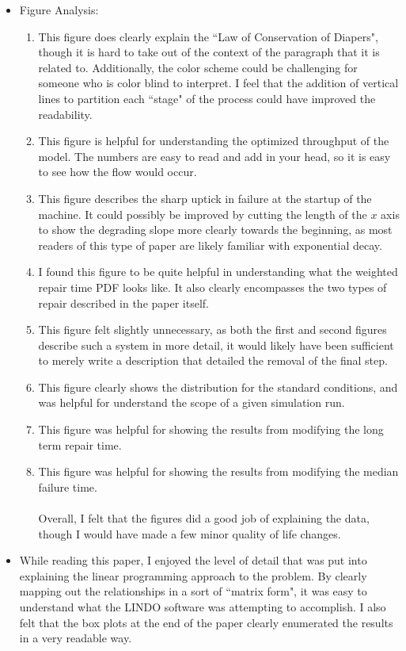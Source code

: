\documentclass[letterpaper,10pt]{article}
\begin{document}
\begin{itemize}
\item Figure Analysis:
\begin{enumerate}
\item This figure does clearly explain the ``Law of Conservation of Diapers", though it is hard to take out of the context of the paragraph that it is related to. Additionally, the color scheme could be challenging for someone who is color blind to interpret. I feel that the addition of vertical lines to partition each ``stage" of the process could have improved the readability.
\item This figure is helpful for understanding the optimized throughput of the model. The numbers are easy to read and add in your head, so it is easy to see how the flow would occur.
\item This figure describes the sharp uptick in failure at the startup of the machine. It could possibly be improved by cutting the length of the $x$ axis to show the degrading slope more clearly towards the beginning, as most readers of this type of paper are likely familiar with exponential decay.
\item I found this figure to be quite helpful in understanding what the weighted repair time PDF looks like. It also clearly encompasses the two types of repair described in the paper itself.
\item This figure felt slightly unnecessary, as both the first and second figures describe such a system in more detail, it would likely have been sufficient to merely write a description that detailed the removal of the final step.
\item This figure clearly shows the distribution for the standard conditions, and was helpful for understand the scope of a given simulation run.
\item This figure was helpful for showing the results from modifying the long term repair time.
\item This figure was helpful for showing the results from modifying the median failure time.\\\\
Overall, I felt that the figures did a good job of explaining the data, though I would have made a few minor quality of life changes.
\end{enumerate}
\item While reading this paper, I enjoyed the level of detail that was put into explaining the linear programming approach to the problem. By clearly mapping out the relationships in a sort of ``matrix form", it was easy to understand what the LINDO software was attempting to accomplish. I also felt that the box plots at the end of the paper clearly enumerated the results in a very readable way.

\end{itemize}
\end{document}
